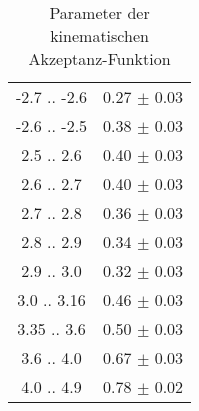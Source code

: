\begin{table}[h]
\begin{tabular}{|c|c|}
        -2.7  .. -2.6  & 0.27 $\pm$ 0.03 \\
        -2.6  .. -2.5  & 0.38 $\pm$ 0.03 \\
        \hline
         2.5  ..  2.6  & 0.40 $\pm$ 0.03 \\
         2.6  ..  2.7  & 0.40 $\pm$ 0.03 \\
         2.7  ..  2.8  & 0.36 $\pm$ 0.03 \\
         2.8  ..  2.9  & 0.34 $\pm$ 0.03 \\
         2.9  ..  3.0  & 0.32 $\pm$ 0.03 \\
         3.0  ..  3.16 & 0.46 $\pm$ 0.03 \\
         3.35 ..  3.6  & 0.50 $\pm$ 0.03 \\
         3.6  ..  4.0  & 0.67 $\pm$ 0.03 \\
         4.0  ..  4.9  & 0.78 $\pm$ 0.02 \\
         \hline
    \end{tabular}
    \caption{Parameter der kinematischen Akzeptanz-Funktion}
    \label{tab:acceptance_parameters}
\end{table}
